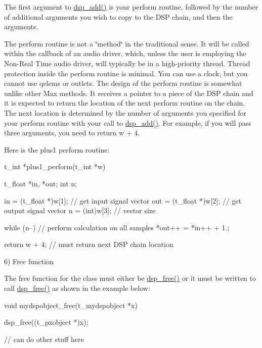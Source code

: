 The first argument to \hyperlink{group__msp_gae9a75fa230b1db6d8316405d4a6065cc}{dsp\_\-add()} is your perform routine, followed by the number of additional arguments you wish to copy to the DSP chain, and then the arguments.

The perform routine is not a \char`\"{}method\char`\"{} in the traditional sense. It will be called within the callback of an audio driver, which, unless the user is employing the Non-\/Real Time audio driver, will typically be in a high-\/priority thread. Thread protection inside the perform routine is minimal. You can use a clock, but you cannot use qelems or outlets. The design of the perform routine is somewhat unlike other Max methods. It receives a pointer to a piece of the DSP chain and it is expected to return the location of the next perform routine on the chain. The next location is determined by the number of arguments you specified for your perform routine with your call to \hyperlink{group__msp_gae9a75fa230b1db6d8316405d4a6065cc}{dsp\_\-add()}. For example, if you will pass three arguments, you need to return w + 4.

Here is the plus1 perform routine:


\begin{DoxyCode}
    t_int *plus1_perform(t_int *w)
    {
        t_float *in, *out;
        int n;

        in = (t_float *)w[1];       // get input signal vector
        out = (t_float *)w[2];      // get output signal vector
        n = (int)w[3];          // vector size

    
        while (n--)         // perform calculation on all samples
            *out++ = *in++ + 1.;
    
        return w + 4;           // must return next DSP chain location
    }
\end{DoxyCode}


6) Free function

The free function for the class must either be \hyperlink{group__msp_ga9a981adf6eea7e55d11c1a0b02592a6e}{dsp\_\-free()} or it must be written to call \hyperlink{group__msp_ga9a981adf6eea7e55d11c1a0b02592a6e}{dsp\_\-free()} as shown in the example below:


\begin{DoxyCode}
    void mydspobject_free(t_mydspobject *x)
    {
        dsp_free((t_pxobject *)x);

        // can do other stuff here
    }
\end{DoxyCode}
 